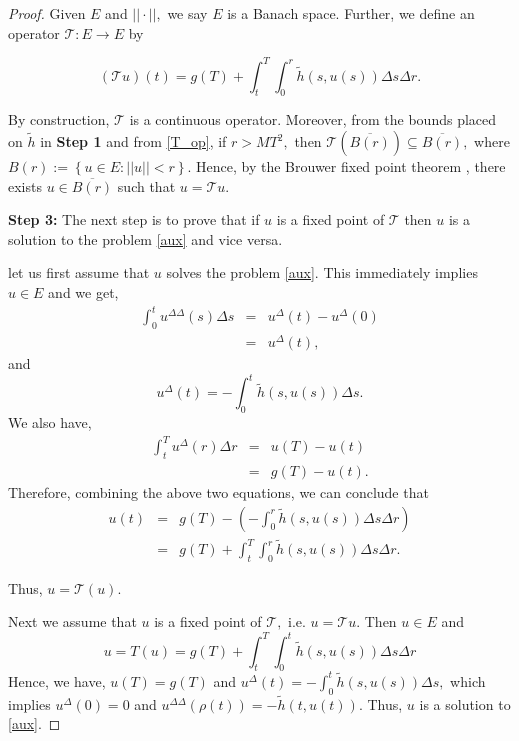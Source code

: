 \documentclass[12pt,reqno]{amsart}
\begin{document}
\begin{proof}
	Given $E$ and $||\cdot||,$ we say $E$ is a Banach space.  Further, we define an operator $\mathcal{T} : E \rightarrow E$ by
	
	\begin{equation}\label{T_op}
	\left(\mathcal{T}u\right)(t) = g(T)+\int_{t}^{T} \int_{0}^{r} \tilde{h}(s, u(s)) \Delta s \Delta r.
	\end{equation}
	
By construction, $\mathcal{T}$ is a continuous operator.  Moreover, from the bounds placed on $\tilde{h}$ in \textbf{Step 1} and from \eqref{T_op}, if $r>MT^2,$ then $\mathcal{T}\left(\overline{B(r)}\right) \subseteq \overline{B(r)},$ where $B(r) := \left\{u \in E : ||u|| < r\right\}.$  Hence, by the Brouwer fixed point theorem \cite{zeidler1986}, there exists $u \in \overline{B(r)}$ such that $u = \mathcal{T}u.$
	
    \textbf{Step 3:} The next step is to prove that if $u$ is a fixed point of $\mathcal{T}$ then $u$ is a solution to the problem \eqref{aux} and vice versa.
    \par let us first assume that $u$ solves the problem \eqref{aux}. This immediately implies $u \in E$ and we get,
    \begin{eqnarray*}
    	\int_{0}^{t} u^{\Delta\Delta}(s) \Delta s & = & u^{\Delta}(t) - u^{\Delta}(0) \\
    	& = & u^{\Delta}(t),
    \end{eqnarray*}
    and $$u^{\Delta}(t) = - \int_{0}^{t} \tilde{h}(s, u(s)) \Delta s. $$
    We also have,
    \begin{eqnarray*}
    	\int_{t}^{T} u^{\Delta}(r) \Delta r & = & u(T) - u(t) \\
    	& = & g(T)- u(t).
    \end{eqnarray*}
 Therefore, combining the above two equations, we can conclude that 
    \begin{eqnarray*}
    	u(t) & = & g(T)- \left(- \int_{0}^{r} \tilde{h}(s, u(s)) \Delta s \Delta r\right) \\
    	& = & g(T) + \int_{t}^{T} \int_{0}^{r} \tilde{h}(s, u(s)) \Delta s \Delta r.
    \end{eqnarray*}

	Thus, $u = \mathcal{T}(u).$
	
\par Next we assume that $u$ is a fixed point of $\mathcal{T},$ i.e. $u = \mathcal{T}u.$ Then $u \in E$ and 
\begin{equation*}
    u=T(u)=g(T)+\displaystyle\int_{t}^{T}\int_{0}^{t}\tilde{h}(s,u(s))\Delta s\Delta r
\end{equation*}
Hence, we have, $u(T)=g(T)$ and $u^{\Delta}(t) =  - \int_{0}^{t} \tilde{h}(s, u(s)) \Delta s,$ which implies $u^{\Delta}(0) = 0$ and  $u^{\Delta\Delta}(\rho(t)) = - \tilde{h}(t, u(t)).$  Thus, $u$ is a solution to \eqref{aux}.
		

\end{proof}
\end{document}

